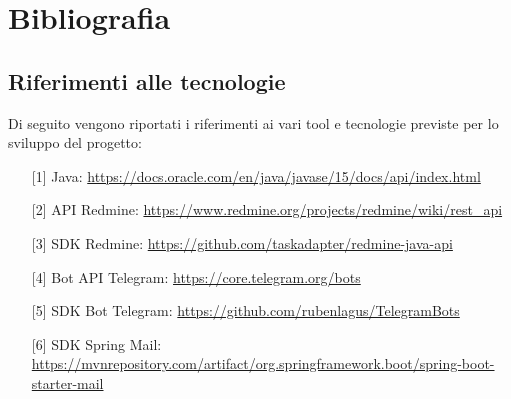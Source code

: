 

\cleardoublepage
\chapter{Bibliografia}
\section{Riferimenti alle tecnologie}
Di seguito vengono riportati i riferimenti ai vari tool e tecnologie previste per lo sviluppo del progetto:
\begin{enumerate}
	\item[ {[}1{]} ] Java: \url{https://docs.oracle.com/en/java/javase/15/docs/api/index.html}
	\item[ {[}2{]} ] API Redmine: \url{https://www.redmine.org/projects/redmine/wiki/rest_api}
	\item[ {[}3{]} ] SDK Redmine: \url{https://github.com/taskadapter/redmine-java-api}
	\item[ {[}4{]} ] Bot API Telegram: \url{https://core.telegram.org/bots}
	\item[ {[}5{]} ] SDK Bot Telegram: \url{https://github.com/rubenlagus/TelegramBots}
	\item[ {[}6{]} ] SDK Spring Mail: \url{https://mvnrepository.com/artifact/org.springframework.boot/spring-boot-starter-mail}
\end{enumerate}

\nocite{*}
\printbibliography[heading=subbibliography,title={Riferimenti bibliografici},type=book]

\printbibliography[heading=subbibliography,title={Siti web consultati},type=online]

